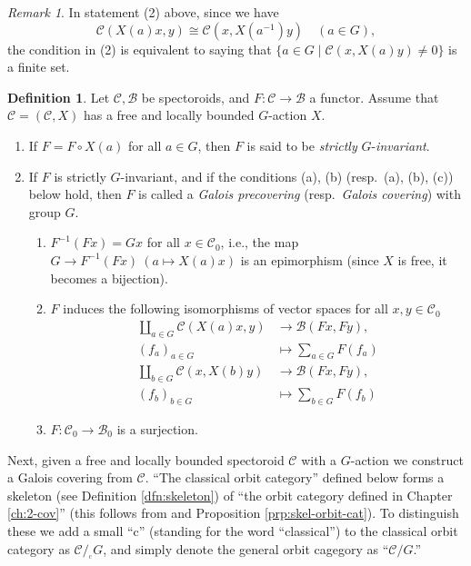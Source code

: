 \documentclass{surv-l}
\numberwithin{equation}{chapter}
\numberwithin{figure}{chapter}
\theoremstyle{plain}
\theoremstyle{definition}
\newtheorem{dfn}[thm]{Definition}
\theoremstyle{remark}
\newtheorem{rmk}[thm]{Remark}
\newcommand{\corbit}{/\!_{_{\mathrm{c}}}}
\begin{document}
\begin{rmk}
In statement (2) above, since we have
\[
{\mathcal{C}}(X(a)x, y) \cong {\mathcal{C}}(x, X(a^{-1})y)\quad (a \in G),
\]
the condition in (2) is equivalent to
saying that $\{a \in G \mid {\mathcal{C}}(x, X(a)y) \ne 0\}$ is a finite set.
\end{rmk}

\begin{dfn}
Let ${\mathcal{C}}, \mathcal{B}$ be spectoroids, and $F \colon {\mathcal{C}} \to \mathcal{B}$ a functor.
Assume that
${\mathcal{C}} = ({\mathcal{C}} ,X)$ has a free and locally bounded $G$-action $X$.
\begin{enumerate}
\item If $F = F\circ X(a)$ for all $a \in G$, then $F$ is said to be \emph{strictly} $G$-\emph{invariant}.
\item If $F$ is strictly $G$-invariant, and if the conditions
(a), (b) (resp.\ (a), (b), (c)) below hold,
then $F$ is called a \emph{Galois precovering} (resp.\ \emph{Galois covering})
with group $G$.
\begin{enumerate}
\item $F^{-1}(Fx) = Gx$ for all $x \in {\mathcal{C}}_0$, i.e., the map
$G \to F^{-1}(Fx)\ (a \mapsto X(a)x)$ is an epimorphism
(since $X$ is free, it becomes a bijection).
\item $F$ induces the following isomorphisms of vector spaces for all $x, y \in {\mathcal{C}}_0$
\[
\begin{aligned}
\coprod_{a \in G}{\mathcal{C}}(X(a)x, y) &\to \mathcal{B}(Fx, Fy),\\
(f_{a})_{a\in G}&\mapsto\sum_{a\in G}F(f_{a})\\
\coprod_{b\in G}{\mathcal{C}}(x,X(b)y)  &\to  \mathcal{B}(Fx,Fy),\\
(f_{b})_{b\in G}&\mapsto \sum_{b\in G} F(f_{b})
\end{aligned}
\]
\item $F \colon {\mathcal{C}}_0 \to \mathcal{B}_0$ is a surjection.
\end{enumerate}
\end{enumerate}
\end{dfn}

Next, given a free and locally bounded spectoroid ${\mathcal{C}}$ with a $G$-action
we construct a Galois covering from ${\mathcal{C}}$.
``The classical orbit category'' defined below forms
a skeleton (see Definition \ref{dfn:skeleton}) of ``the orbit category
defined in Chapter \ref{ch:2-cov}''
(this follows from \cite[Proposition 2.11]{Asa11} and Proposition \ref{prp:skel-orbit-cat}).
To distinguish these we add a small ``c'' (standing for the word ``classical'')
to the classical orbit category as ${\mathcal{C}}\corbit G$, and simply denote
the general orbit cagegory as ``${\mathcal{C}}/G$.''
\end{document}
